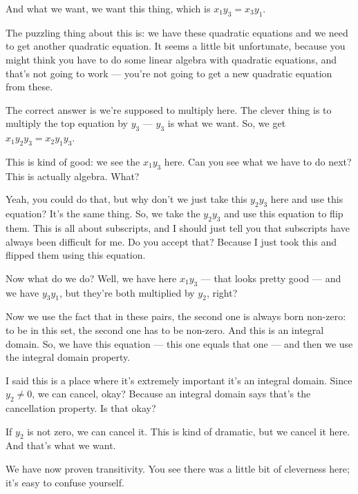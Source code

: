 \begin{speech}[00:47:20 - 00:48:40]
And what we want,  we want this thing, which is $x_1 y_3 = x_3 y_1$. 

The puzzling thing about this is: we have these quadratic equations and we need to get another quadratic equation. It seems a little bit unfortunate, because you might think you have to do some linear algebra with quadratic equations, and that's not going to work --- you're not going to get a new quadratic equation from these.

The correct answer is we're supposed to multiply here. The clever thing is to multiply the top equation by $y_3$  --- $y_3$ is what we want. So, we get $x_1 y_2 y_3 = x_2 y_1 y_3$. 

This is kind of good: we see the $x_1 y_3$ here. Can you see what we have to do next? This is actually algebra. What?

Yeah, you could do that, but why don't we just take this $y_2 y_3$ here and use this equation? It's the same thing. So, we take the $y_2 y_3$ and use this equation to flip them. This is all about subscripts, and I should just tell you that subscripts have always been difficult for me. Do you accept that? Because I just took this and flipped them using this equation. 
\end{speech}

\begin{speech}[00:48:40 - 00:50:02]
Now what do we do? Well, we have here $x_1 y_3$ --- that looks pretty good --- and we have $y_3 y_1$, but they're both multiplied by $y_2$, right?

Now we use the fact that in these pairs, the second one is always born non-zero: to be in this set, the second one has to be non-zero. And this is an integral domain. So, we have this equation --- this one equals that one --- and then we use the integral domain property. 

I said this is a place where it's extremely important it's an integral domain. Since $y_2 \neq 0$,  we can cancel,  okay? Because an integral domain says that's the cancellation property. Is that okay?

If $y_2$ is not zero, we can cancel it. This is kind of dramatic, but we cancel it here.  And that's what we want.

We have now proven transitivity. You see there was a little bit of cleverness here; it's easy to confuse yourself.
\end{speech}

